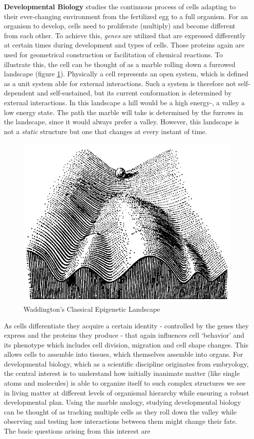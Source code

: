 \documentclass[10pt, b5paper, singlespacinge, twoside]{reedthesis} %
\theoremstyle{definition}
\theoremstyle{definition}
\theoremstyle{definition}
\theoremstyle{remark}
\begin{document}
\textbf{Developmental Biology} studies the continuous process of cells adapting to their ever-changing environment from the fertilized egg to a full organism. For an organism to develop, cells need to proliferate (multiply) and become different from each other. To achieve this, \emph{genes} are utilized that are expressed differently at certain times during development and types of cells. Those proteins again are used for geometrical construction or facilitation of chemical reactions. To illustrate this, the cell can be thought of as a marble rolling down a furrowed landscape (figure \ref{fig:wadd}). Physically a cell represents an open system, which is defined as a unit system able for external interactions. Such a system is therefore not self-dependent and self-sustained, but its current conformation is determined by external interactions. In this landscape a hill would be a high energy-, a valley a low energy state. The path the marble will take is determined by the furrows in the landscape, since it would always prefer a valley. However, this landscape is not a \emph{static} structure but one that changes at every instant of time.
\begin{figure}[h]

{\centering \includegraphics[width=0.5\linewidth]{figures/intro/waddington} 

}

\caption{Waddington's Classical Epigenetic Landscape}\label{fig:wadd}
\end{figure}
As cells differentiate they acquire a certain identity - controlled by the genes they express and the proteins they produce - that again influences cell `behavior' and its phenotype which includes cell division, migration and cell shape changes. This allows cells to assemble into tissues, which themselves assemble into organs. For developmental biology, which as a scientific discipline originates from embryology, the central interest is to understand how initially inanimate matter (like single atoms and molecules) is able to organize itself to such complex structures we see in living matter at different levels of organismal hierarchy while ensuring a robust developmental plan. Using the marble analogy, studying developmental biology can be thought of as tracking multiple cells as they roll down the valley while observing and testing how interactions between them might change their fate. The basic questions arising from this interest are
\end{document}

